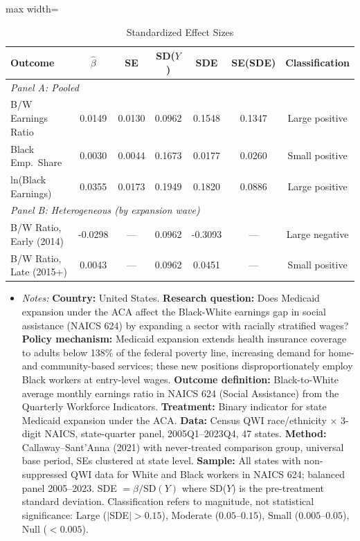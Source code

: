\begin{table}[t]
\centering
\caption{Standardized Effect Sizes}
\label{tab:sde}
\begin{adjustbox}{max width=\textwidth}
\begin{tabular}{lcccccc}
\hline\hline
Outcome & $\hat{\beta}$ & SE & SD($Y$) & SDE & SE(SDE) & Classification \\
\hline
\multicolumn{7}{l}{\textit{Panel A: Pooled}} \\
B/W Earnings Ratio & 0.0149 & 0.0130 & 0.0962 & 0.1548 & 0.1347 & Large positive \\
Black Emp.\ Share & 0.0030 & 0.0044 & 0.1673 & 0.0177 & 0.0260 & Small positive \\
ln(Black Earnings) & 0.0355 & 0.0173 & 0.1949 & 0.1820 & 0.0886 & Large positive \\
\hline
\multicolumn{7}{l}{\textit{Panel B: Heterogeneous (by expansion wave)}} \\
B/W Ratio, Early (2014) & -0.0298 & --- & 0.0962 & -0.3093 & --- & Large negative \\
B/W Ratio, Late (2015+) & 0.0043 & --- & 0.0962 & 0.0451 & --- & Small positive \\
\hline\hline
\end{tabular}
\end{adjustbox}

\vspace{0.5em}
\begin{minipage}{0.95\textwidth}
\footnotesize
\begin{itemize}[leftmargin=*,nosep]
\item \textit{Notes:} \textbf{Country:} United States. \textbf{Research question:} Does Medicaid expansion under the ACA affect the Black-White earnings gap in social assistance (NAICS 624) by expanding a sector with racially stratified wages? \textbf{Policy mechanism:} Medicaid expansion extends health insurance coverage to adults below 138\% of the federal poverty line, increasing demand for home- and community-based services; these new positions disproportionately employ Black workers at entry-level wages. \textbf{Outcome definition:} Black-to-White average monthly earnings ratio in NAICS 624 (Social Assistance) from the Quarterly Workforce Indicators. \textbf{Treatment:} Binary indicator for state Medicaid expansion under the ACA. \textbf{Data:} Census QWI race/ethnicity $\times$ 3-digit NAICS, state-quarter panel, 2005Q1--2023Q4, 47 states. \textbf{Method:} Callaway--Sant'Anna (2021) with never-treated comparison group, universal base period, SEs clustered at state level. \textbf{Sample:} All states with non-suppressed QWI data for White and Black workers in NAICS 624; balanced panel 2005--2023. SDE $= \hat{\beta} / \text{SD}(Y)$ where SD($Y$) is the pre-treatment standard deviation. Classification refers to magnitude, not statistical significance: Large ($|$SDE$| > 0.15$), Moderate ($0.05$--$0.15$), Small ($0.005$--$0.05$), Null ($< 0.005$).
\end{itemize}
\end{minipage}
\end{table}
